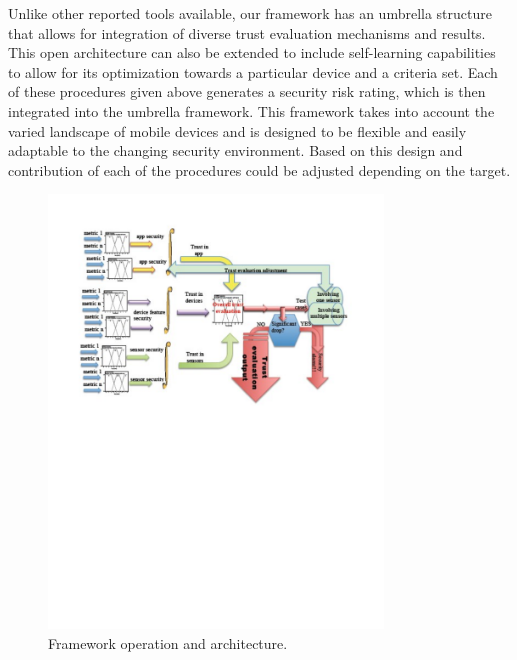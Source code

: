 Unlike other reported tools available, our framework has an umbrella structure that allows for integration of 
diverse trust evaluation mechanisms and results. This open architecture can also be extended to include 
 self-learning capabilities to allow for its optimization towards a particular device and a criteria set. Each of these procedures given above generates a security risk rating, which is then integrated into the umbrella framework. This framework takes into account the varied landscape of mobile devices and is designed to be flexible and easily adaptable to the changing security environment. Based on this design and contribution of each of the procedures could be adjusted depending on the target.
\begin{figure}
\centering
\includegraphics[width=3.5in]{umbrella_framework.pdf}
\caption{Framework operation and architecture.}
\label{fig:umbrella}
\end{figure}

